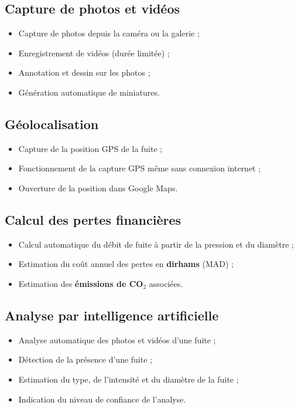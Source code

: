 \documentclass[12pt,a4paper,oneside]{report}
\begin{document}
\subsection{Capture de photos et vidéos}
\begin{itemize}
    \item Capture de photos depuis la caméra ou la galerie ;
    \item Enregistrement de vidéos (durée limitée) ;
    \item Annotation et dessin sur les photos ;
    \item Génération automatique de miniatures.
\end{itemize}

\subsection{Géolocalisation}
\begin{itemize}
    \item Capture de la position GPS de la fuite ;
    \item Fonctionnement de la capture GPS même sans connexion internet ;
    \item Ouverture de la position dans Google Maps.
\end{itemize}

\subsection{Calcul des pertes financières}
\begin{itemize}
    \item Calcul automatique du débit de fuite à partir de la pression et du diamètre ;
    \item Estimation du coût annuel des pertes en \textbf{dirhams} (MAD) ;
    \item Estimation des \textbf{émissions de CO$_2$} associées.
\end{itemize}

\subsection{Analyse par intelligence artificielle}
\begin{itemize}
    \item Analyse automatique des photos et vidéos d'une fuite ;
    \item Détection de la présence d'une fuite ;
    \item Estimation du type, de l'intensité et du diamètre de la fuite ;
    \item Indication du niveau de confiance de l'analyse.
\end{itemize}
\end{document}
